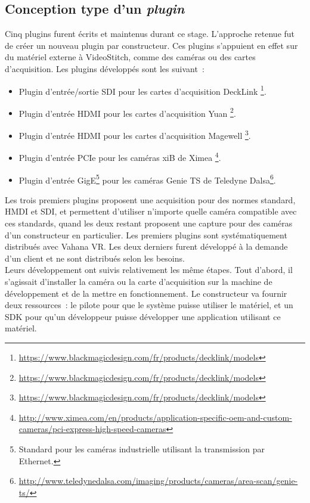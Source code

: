 \subsection{Conception type d'un \textit{plugin}}
Cinq plugins furent écrits et maintenus durant ce stage. L'approche retenue fut de créer
un nouveau plugin par constructeur. Ces plugins s'appuient en effet sur du matériel
externe à VideoStitch, comme des caméras ou des cartes d'acquisition. Les plugins
développés sont les suivant~:
\begin{itemize}
  \item Plugin d'entrée/sortie SDI pour les cartes d'acquisition DeckLink
  \footnote{\url{https://www.blackmagicdesign.com/fr/products/decklink/models}}.
  \item Plugin d'entrée HDMI pour les cartes d'acquisition Yuan
  \footnote{\url{https://www.blackmagicdesign.com/fr/products/decklink/models}}.
  \item Plugin d'entrée HDMI pour les cartes d'acquisition Magewell
  \footnote{\url{https://www.blackmagicdesign.com/fr/products/decklink/models}}.
  \item Plugin d'entrée PCIe pour les caméras xiB de Ximea
  \footnote{\url{http://www.ximea.com/en/products/application-specific-oem-and-custom-cameras/pci-express-high-speed-cameras}}.
  \item Plugin d'entrée GigE\footnote{Standard pour les caméras industrielle utilisant 
  la transmission par Ethernet\cite{gige}.} pour les caméras Genie TS de Teledyne Dalsa\footnote{\url{http://www.teledynedalsa.com/imaging/products/cameras/area-scan/genie-ts/}}.
\end{itemize}
Les trois premiers plugins proposent une acquisition pour des normes standard, HMDI et SDI, 
et permettent d'utiliser n'importe quelle caméra compatible avec ces standards, quand les
deux restant proposent une capture pour des caméras d'un constructeur en particulier.
Les premiers plugins sont systématiquement distribués avec Vahana VR. Les deux derniers
furent développé à la demande d'un client et ne sont distribués selon les besoins.\\
\newline
Leurs développement ont suivis relativement les même étapes.
Tout d'abord, il s'agissait d'installer la caméra ou la carte d'acquisition sur la 
machine de développement et de la mettre en fonctionnement. Le constructeur va fournir
deux ressources~: le pilote pour que le système puisse utiliser le matériel, et un
SDK pour qu'un développeur puisse développer une application utilisant ce matériel.
